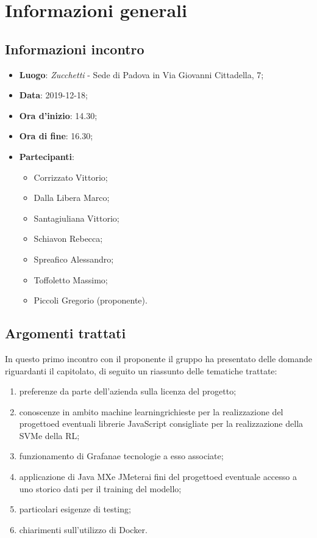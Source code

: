 \section{Informazioni generali}
    \subsection{Informazioni incontro}
        \begin{itemize}
            \item \textbf{Luogo}: \textit{Zucchetti} - Sede di Padova in Via Giovanni Cittadella, 7;
            \item \textbf{Data}: 2019-12-18;
            \item \textbf{Ora d'inizio}: 14.30;
            \item \textbf{Ora di fine}: 16.30;
            \item \textbf{Partecipanti}: \begin{itemize}
                \item Corrizzato Vittorio;
                \item Dalla Libera Marco;
                \item Santagiuliana Vittorio;
                \item Schiavon Rebecca;
                \item Spreafico Alessandro;
                \item Toffoletto Massimo;
                \item Piccoli Gregorio (proponente).
            \end{itemize}
        \end{itemize}
    \subsection{Argomenti trattati}
        In questo primo incontro con il proponente il gruppo ha presentato delle domande riguardanti il capitolato\glo, di seguito un riassunto delle tematiche trattate:
        \begin{enumerate}
            \item preferenze da parte dell'azienda sulla licenza del progetto\glo;
            \item conoscenze in ambito machine learning\glosp richieste per la realizzazione del progetto\glo ed eventuali librerie JavaScript consigliate per la               realizzazione della SVM\glosp e della RL\glo;
            \item funzionamento di Grafana\glosp e tecnologie a esso associate;
            \item applicazione di Java MX\glosp e JMeter\glosp ai fini del progetto\glosp ed eventuale accesso a uno storico dati per il training del modello;
            \item particolari esigenze di testing;
            \item chiarimenti sull'utilizzo di Docker.
        \end{enumerate}
